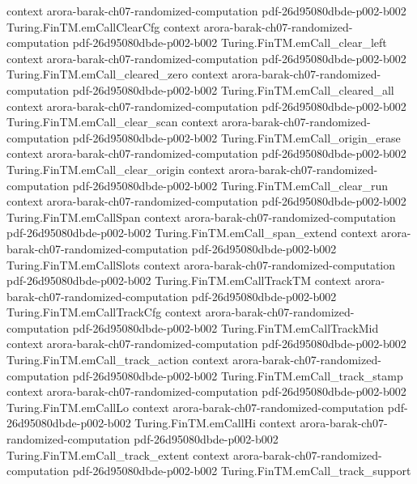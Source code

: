 \begin{theorem}
  {context}
  {arora-barak-ch07-randomized-computation}
  {pdf-26d95080dbde-p002-b002}
\proofstep
  {Turing.FinTM.emCallClearCfg}
  {context}
  {arora-barak-ch07-randomized-computation}
  {pdf-26d95080dbde-p002-b002}
\proofstep
  {Turing.FinTM.emCall_clear_left}
  {context}
  {arora-barak-ch07-randomized-computation}
  {pdf-26d95080dbde-p002-b002}
\proofstep
  {Turing.FinTM.emCall_cleared_zero}
  {context}
  {arora-barak-ch07-randomized-computation}
  {pdf-26d95080dbde-p002-b002}
\proofstep
  {Turing.FinTM.emCall_cleared_all}
  {context}
  {arora-barak-ch07-randomized-computation}
  {pdf-26d95080dbde-p002-b002}
\proofstep
  {Turing.FinTM.emCall_clear_scan}
  {context}
  {arora-barak-ch07-randomized-computation}
  {pdf-26d95080dbde-p002-b002}
\proofstep
  {Turing.FinTM.emCall_origin_erase}
  {context}
  {arora-barak-ch07-randomized-computation}
  {pdf-26d95080dbde-p002-b002}
\proofstep
  {Turing.FinTM.emCall_clear_origin}
  {context}
  {arora-barak-ch07-randomized-computation}
  {pdf-26d95080dbde-p002-b002}
\proofstep
  {Turing.FinTM.emCall_clear_run}
  {context}
  {arora-barak-ch07-randomized-computation}
  {pdf-26d95080dbde-p002-b002}
\proofstep
  {Turing.FinTM.emCallSpan}
  {context}
  {arora-barak-ch07-randomized-computation}
  {pdf-26d95080dbde-p002-b002}
\proofstep
  {Turing.FinTM.emCall_span_extend}
  {context}
  {arora-barak-ch07-randomized-computation}
  {pdf-26d95080dbde-p002-b002}
\proofstep
  {Turing.FinTM.emCallSlots}
  {context}
  {arora-barak-ch07-randomized-computation}
  {pdf-26d95080dbde-p002-b002}
\proofstep
  {Turing.FinTM.emCallTrackTM}
  {context}
  {arora-barak-ch07-randomized-computation}
  {pdf-26d95080dbde-p002-b002}
\proofstep
  {Turing.FinTM.emCallTrackCfg}
  {context}
  {arora-barak-ch07-randomized-computation}
  {pdf-26d95080dbde-p002-b002}
\proofstep
  {Turing.FinTM.emCallTrackMid}
  {context}
  {arora-barak-ch07-randomized-computation}
  {pdf-26d95080dbde-p002-b002}
\proofstep
  {Turing.FinTM.emCall_track_action}
  {context}
  {arora-barak-ch07-randomized-computation}
  {pdf-26d95080dbde-p002-b002}
\proofstep
  {Turing.FinTM.emCall_track_stamp}
  {context}
  {arora-barak-ch07-randomized-computation}
  {pdf-26d95080dbde-p002-b002}
\proofstep
  {Turing.FinTM.emCallLo}
  {context}
  {arora-barak-ch07-randomized-computation}
  {pdf-26d95080dbde-p002-b002}
\proofstep
  {Turing.FinTM.emCallHi}
  {context}
  {arora-barak-ch07-randomized-computation}
  {pdf-26d95080dbde-p002-b002}
\proofstep
  {Turing.FinTM.emCall_track_extent}
  {context}
  {arora-barak-ch07-randomized-computation}
  {pdf-26d95080dbde-p002-b002}
\proofstep
  {Turing.FinTM.emCall_track_support}

\end{theorem}
